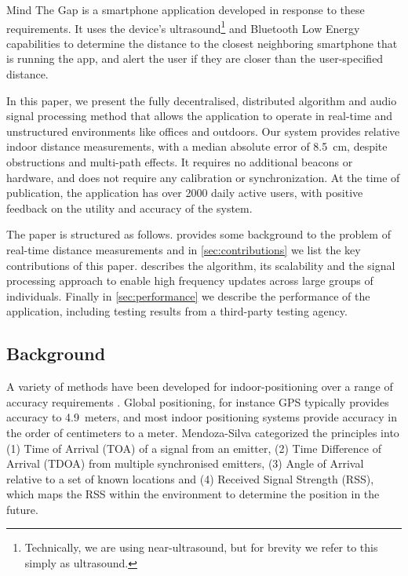 \documentclass{article}
\begin{document}
Mind The Gap is a smartphone application developed in response to these requirements. It uses the device's ultrasound\footnote{Technically, we are using near-ultrasound, but for brevity we refer to this simply as ultrasound.} and Bluetooth Low Energy capabilities to determine the distance to the closest neighboring smartphone that is running the app, and alert the user if they are closer than the user-specified distance.

In this paper, we present the fully decentralised, distributed algorithm and audio signal processing method that allows the application to operate in real-time and unstructured environments like offices and outdoors. Our system provides relative indoor distance measurements, with a median absolute error of 8.5~cm, despite obstructions and  multi-path effects. It requires no additional beacons or hardware, and does not require any calibration or  synchronization.  At the time of publication, the application has over 2000 daily active users, with positive feedback on the utility and accuracy of the system.

The paper is structured as follows.  provides some background to the problem of real-time distance measurements and in \cref{sec:contributions} we list the key contributions of this paper.  describes the algorithm, its scalability and the signal processing approach to enable high frequency updates across large groups of individuals. Finally in \cref{sec:performance} we describe the performance of the application, including testing results from a third-party testing agency.

\subsection{Background}
\label{sec:background}

A variety of methods have been developed for indoor-positioning over a range of accuracy requirements \cite{MendozaSilva2019}. Global positioning, for instance GPS typically provides accuracy to 4.9~meters, and most indoor positioning systems provide accuracy in the order of centimeters to a meter. Mendoza-Silva categorized the principles into (1) Time of Arrival (TOA) of a signal from an emitter, (2) Time Difference of Arrival (TDOA) from multiple synchronised emitters, (3) Angle of Arrival relative to a set of known locations and (4) Received Signal Strength (RSS), which maps the RSS within the environment to determine the position in the future. 
\end{document}
